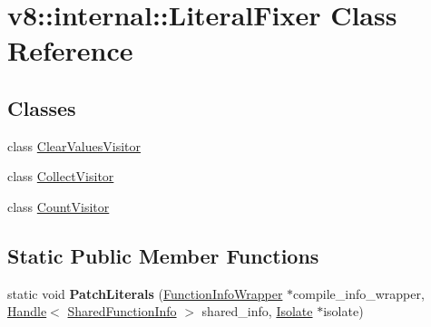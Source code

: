 \hypertarget{classv8_1_1internal_1_1_literal_fixer}{}\section{v8\+:\+:internal\+:\+:Literal\+Fixer Class Reference}
\label{classv8_1_1internal_1_1_literal_fixer}
\subsection*{Classes}
\begin{DoxyCompactItemize}
\item 
class \hyperlink{classv8_1_1internal_1_1_literal_fixer_1_1_clear_values_visitor}{Clear\+Values\+Visitor}
\item 
class \hyperlink{classv8_1_1internal_1_1_literal_fixer_1_1_collect_visitor}{Collect\+Visitor}
\item 
class \hyperlink{classv8_1_1internal_1_1_literal_fixer_1_1_count_visitor}{Count\+Visitor}
\end{DoxyCompactItemize}
\subsection*{Static Public Member Functions}
\begin{DoxyCompactItemize}
\item 
static void {\bfseries Patch\+Literals} (\hyperlink{classv8_1_1internal_1_1_function_info_wrapper}{Function\+Info\+Wrapper} $\ast$compile\+\_\+info\+\_\+wrapper, \hyperlink{classv8_1_1internal_1_1_handle}{Handle}$<$ \hyperlink{classv8_1_1internal_1_1_shared_function_info}{Shared\+Function\+Info} $>$ shared\+\_\+info, \hyperlink{classv8_1_1internal_1_1_isolate}{Isolate} $\ast$isolate)\hypertarget{classv8_1_1internal_1_1_literal_fixer_a9b8eb530fe146671213398028383a6de}{}\label{classv8_1_1internal_1_1_literal_fixer_a9b8eb530fe146671213398028383a6de}

\end{DoxyCompactItemize}
